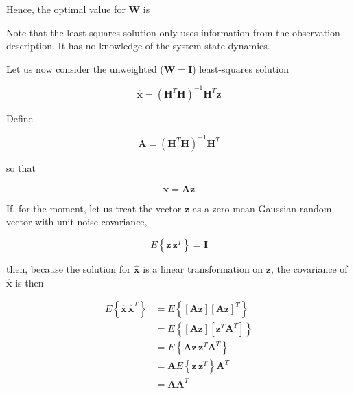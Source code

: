 \documentclass[12pt]{article}
\begin{document}
Hence, the optimal value for $\mathbf{W}$ is


Note that the least-squares solution only uses information from the observation
description. It has no knowledge of the system state dynamics.

Let us now consider the unweighted ($\mathbf{W} = \mathbf{I}$) least-squares solution

\begin{equation*}
    \hat{\mathbf{x}} = \left( \mathbf{H}^T \mathbf{H} \right)^{-1} \mathbf{H}^T \mathbf{z}
\end{equation*}

Define

\begin{equation*}
    \mathbf{A} = \left( \mathbf{H}^T \mathbf{H} \right)^{-1} \mathbf{H}^T
\end{equation*}

so that

\begin{equation*}
    \hat{\mathbf{x}} = \mathbf{A} \mathbf{z}
\end{equation*}

If, for the moment, let us treat the vector $\mathbf{z}$ as a zero-mean Gaussian random
vector with unit noise covariance,

\begin{equation*}
    E \left\{ \mathbf{z} \, \mathbf{z}^T \right\} = \mathbf{I}
\end{equation*}

then, because the solution for $\hat{\mathbf{x}}$ is a linear transformation on
$\mathbf{z}$, the covariance of $\hat{\mathbf{x}}$ is then

\begin{equation*}
    \begin{aligned}
        E \left\{ \hat{\mathbf{x}} \, \hat{\mathbf{x}}^T \right\} &= E \left\{ \left[ \mathbf{A} \mathbf{z} \right] \left[ \mathbf{A} \mathbf{z} \right]^T \right\} \\
        &= E \left\{ \left[ \mathbf{A} \mathbf{z} \right] \left[ \mathbf{z}^T \mathbf{A}^T \right] \right\} \\
        &= E \left\{ \mathbf{A} \mathbf{z} \, \mathbf{z}^T \mathbf{A}^T \right\} \\
        &= \mathbf{A} E \left\{ \mathbf{z} \, \mathbf{z}^T \right\} \mathbf{A}^T \\
        &= \mathbf{A} \mathbf{A}^T
    \end{aligned}
\end{equation*}
\end{document}
